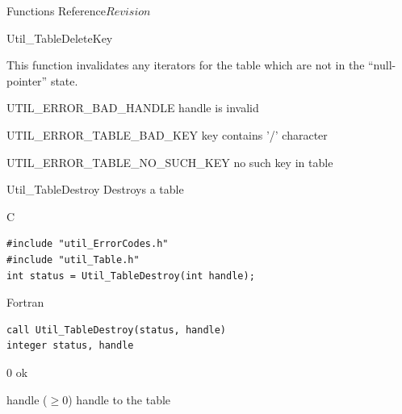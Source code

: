 \begin{cactuspart}{ Functions Reference}{}{$Revision$}
\begin{FunctionDescription}{Util\_TableDeleteKey}
\begin{Discussion}
This function invalidates any iterators for the table which are
not in the ``null-pointer'' state.
\end{Discussion}

\begin{ErrorSection}
\begin{Error}{UTIL\_ERROR\_BAD\_HANDLE}
handle is invalid
\end{Error}
\begin{Error}{UTIL\_ERROR\_TABLE\_BAD\_KEY}
key contains '/' character
\end{Error}
\begin{Error}{UTIL\_ERROR\_TABLE\_NO\_SUCH\_KEY}
no such key in table
\end{Error}
\end{ErrorSection}
\end{FunctionDescription}


\begin{FunctionDescription}{Util\_TableDestroy}
\label{Util-TableDestroy}
Destroys a table

\begin{SynopsisSection}
\begin{Synopsis}{C}
\begin{verbatim}
#include "util_ErrorCodes.h"
#include "util_Table.h"
int status = Util_TableDestroy(int handle);
\end{verbatim}
\end{Synopsis}
\begin{Synopsis}{Fortran}
\begin{verbatim}
call Util_TableDestroy(status, handle)
integer status, handle
\end{verbatim}
\end{Synopsis}
\end{SynopsisSection}

\begin{ResultSection}
\begin{Result}{\rm 0}
ok
\end{Result}
\end{ResultSection}

\begin{ParameterSection}
\begin{Parameter}{handle ($\ge 0$)}
handle to the table
\end{Parameter}
\end{ParameterSection}


\end{FunctionDescription}
\end{cactuspart}
